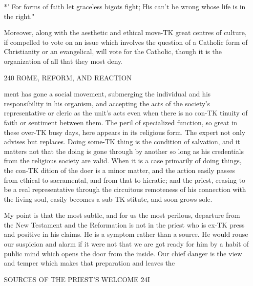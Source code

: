 \documentclass[12pt,a5paper,oneside]{book}
\begin{document}
{*' For forms of faith let graceless bigots fight; 
His can't be wrong whose life is in the right." 

Moreover, along with the aesthetic and ethical move-TK
great centres of culture, if compelled to vote on an issue which 
involves the question of a Catholic form of Christianity or an 
evangelical, will vote for the Catholic, though it is the organization 
of all that they most deny. 



240 ROME, REFORM, AND REACTION 

ment has gone a social movement, submerging the 
individual and his responsibility in his organism, and 
accepting the acts of the society's representative or 
cleric as the unit's acts even when there is no con-TK
tinuity of faith or sentiment between them. The 
peril of specialized function, so great in these over-TK
busy days, here appears in its religious form. The 
expert not only advises but replaces. Doing some-TK
thing is the condition of salvation, and it matters not 
that the doing is gone through by another so long as 
his credentials from the religious society are valid. 
When it is a case primarily of doing things, the con-TK
dition of the doer is a minor matter, and the action 
easily passes from ethical to sacramental, and from 
that to hieratic; and the priest, ceasing to be a real 
representative through the circuitous remoteness of his 
connection with the living soul, easily becomes a sub-TK
stitute, and soon grows sole. 

My point is that the most subtle, and for us the 
most perilous, departure from the New Testament 
and the Reformation is not in the priest who is ex-TK
press and positive in his claims. He is a symptom 
rather than a source. He would rouse our suspicion 
and alarm if it were not that we are got ready for 
him by a habit of public mind which opens the door 
from the inside. Our chief danger is the view and 
temper which makes that preparation and leaves the 



SOURCES OF THE PRIEST'S WELCOME 24I 

}
\end{document}
